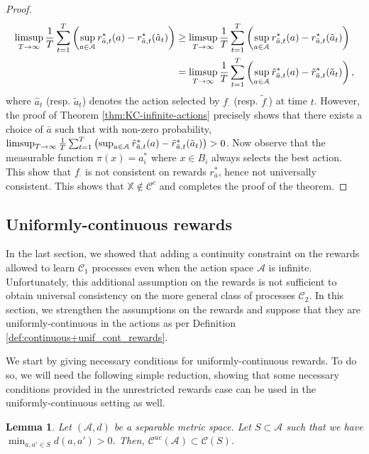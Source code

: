 \documentclass[aos]{imsart}
\theoremstyle{plain}
\newtheorem{lemma}[theorem]{Lemma}
\theoremstyle{remark}
\newcommand{\Acal}{\mathcal{A}}
\newcommand{\Ccal}{\mathcal{C}}
\newcommand{\Xbb}{\mathbb{X}}
\newcommand{\1}{\mathbbm{1}}%
\newcommand{\A}{\mathcal A}
\renewcommand{\limsup}{\mathop{\rm limsup}}
\begin{document}
\begin{proof}
\begin{align*}
    \limsup_{T \to \infty} \frac{1}{T} \sum_{t=1}^{T} \left( \sup_{a \in \A}  r^*_{\bar a,t}(a) -  r^*_{\bar a,t}(\hat a_t) \right) &\geq \limsup_{T \to \infty} \frac{1}{T} \sum_{t=1}^{T} \left( \sup_{a \in \A}  r^*_{\bar a,t}(a) -  r^*_{\bar a,t}(\tilde  a_t) \right)\\
&= \limsup_{T \to \infty} \frac{1}{T} \sum_{t=1}^{T} \left( \sup_{a \in \A} \tilde r^*_{\bar a,t}(a) - \tilde r^*_{\bar a,t}(\tilde a_t) \right),
\end{align*}
where $\hat a_t$ (resp. $\tilde a_t$) denotes the action selected by $f_\cdot$ (resp. $\tilde f_\cdot$) at time $t$. However, the proof of Theorem \ref{thm:KC-infinite-actions} precisely shows that there exists a choice of $\bar a$ such that with non-zero probability, $\limsup_{T \to \infty} \frac{1}{T} \sum_{t=1}^{T} \left( \sup_{a \in \A} \tilde r^*_{\bar a,t}(a) - \tilde r^*_{\bar a,t}(\tilde a_t) \right) >0$. Now observe that the measurable function $\pi(x) = a_i^*$ where $x\in B_i$ always selects the best action. This show that $f_\cdot$ is not consistent on rewards $r^*_{\bar a}$, hence not universally consistent. This shows that $\Xbb\notin\Ccal ^c$ and completes the proof of the theorem.
\end{proof}



\subsection{Uniformly-continuous rewards}
\label{sec:uniformly_continuous_rewards}
In the last section, we showed that adding a continuity constraint on the rewards allowed to learn $\Ccal_1$ processes even when the action space $\Acal$ is infinite. Unfortunately, this additional assumption on the rewards is not sufficient to obtain universal consistency on the more general class of processes $\Ccal_2$. In this section, we strengthen the assumptions on the rewards and suppose that they are  uniformly-continuous in the actions as per Definition \ref{def:continuous+unif_cont_rewards}.



We start by giving necessary conditions for uniformly-continuous rewards. To do so, we will need the following simple reduction, showing that some necessary conditions provided in the unrestricted rewards case can be used in the uniformly-continuous setting as well.

\begin{lemma}\label{lemma:reduction}
    Let $(\Acal,d)$ be a separable metric space. Let $S\subset \Acal$ such that we have $\min_{a,a'\in S}d(a,a')>0$. Then, $\Ccal ^{uc}(\Acal)\subset \Ccal (S)$.
\end{lemma}
\end{document}
